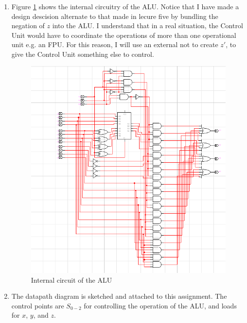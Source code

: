 \documentclass{article}
\begin{document}
\begin{enumerate}
    \item{
      Figure \ref{alucirc} shows the internal circuitry of the ALU.
      Notice that I have made a design descision alternate to that made
      in lecure five by bundling the negation of $z$ into the ALU. I understand
      that in a real situation, the Control Unit would have to coordinate the
      operations of more than one operational unit e.g. an FPU. For this reason,
      I will use an external not to create $z'$, to give the Control Unit something
      else to control.
      \begin{figure}[h]
        \centering
        \includegraphics[width=300pt]{img/alu}
        \caption{\label{alucirc} Internal circuit of the ALU}
      \end{figure}
    }

    \item{
      The datapath diagram is sketched and attached to this assignment.
      The control points are $S_{0-2}$ for controlling the operation of
      the ALU, and loads for $x$, $y$, and $z$.
    }


\end{enumerate}
\end{document}
